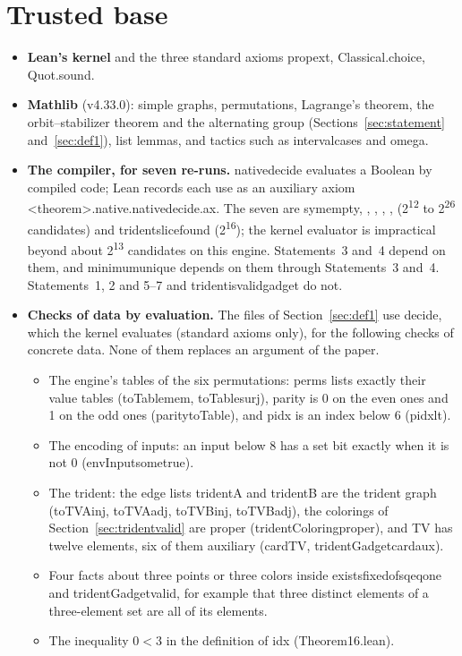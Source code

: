 \documentclass[11pt,a4paper]{article}
\newcommand{\leanus}{\textunderscore\allowbreak}
\newcommand{\lean}[1]{{\ttfamily\let\_\leanus #1}}
\theoremstyle{definition}
\begin{document}
\section{Trusted base}\label{sec:trust}
\begin{itemize}
\item \textbf{Lean's kernel} and the three standard axioms \lean{propext},
\lean{Classical.choice}, \lean{Quot.sound}.
\item \textbf{Mathlib} (v4.33.0): simple graphs, permutations, Lagrange's
theorem, the orbit--stabilizer theorem and the alternating group
(Sections~\ref{sec:statement} and~\ref{sec:def1}), list lemmas, and tactics
such as \lean{interval\_cases} and \lean{omega}.
\item \textbf{The compiler, for seven re-runs.} \lean{native\_decide}
evaluates a Boolean by compiled code; Lean records each use as an auxiliary
axiom \lean{<theorem>.\_native.native\_decide.ax\_1\_1}. The seven are
\lean{sym\_empty\_13}, \lean{\_23}, \lean{\_113}, \lean{\_6}, \lean{\_123},
\lean{\_1113} (2\textsuperscript{12} to 2\textsuperscript{26} candidates) and
\lean{trident\_slice\_found} (2\textsuperscript{16}); the kernel evaluator is
impractical beyond about 2\textsuperscript{13} candidates on this engine.
Statements~3 and~4 depend on them, and \lean{minimum\_unique} depends on
them through Statements~3 and~4. Statements~1, 2 and 5--7 and
\lean{trident\_is\_valid\_gadget} do not.
\item \textbf{Checks of data by evaluation.} The files of
Section~\ref{sec:def1} use \lean{decide}, which the kernel evaluates
(standard axioms only), for the following checks of concrete data. None of
them replaces an argument of the paper.
\begin{itemize}
\item The engine's tables of the six permutations: \lean{perms} lists exactly
their value tables (\lean{toTable\_mem}, \lean{toTable\_surj}), \lean{parity}
is 0 on the even ones and 1 on the odd ones (\lean{parity\_toTable}), and
\lean{pidx} is an index below 6 (\lean{pidx\_lt}).
\item The encoding of inputs: an input below 8 has a set bit exactly when it
is not 0 (\lean{envInput\_some\_true}).
\item The trident: the edge lists \lean{tridentA} and \lean{tridentB} are the
trident graph (\lean{toTVA\_inj}, \lean{toTVA\_adj}, \lean{toTVB\_inj},
\lean{toTVB\_adj}), the colorings of Section~\ref{sec:tridentvalid} are proper
(\lean{tridentColoring\_proper}), and \lean{TV} has twelve elements, six of
them auxiliary (\lean{card\_TV}, \lean{tridentGadget\_card\_aux}).
\item Four facts about three points or three colors inside
\lean{exists\_fixed\_of\_sq\_eq\_one} and \lean{tridentGadget\_valid}, for
example that three distinct elements of a three-element set are all of its
elements.
\item The inequality $0<3$ in the definition of \lean{idx}
(\lean{Theorem16.lean}).
\end{itemize}
\end{itemize}

\end{document}

